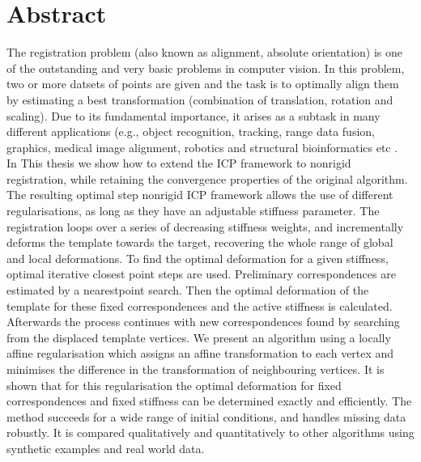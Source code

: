 \documentclass[../structure.tex]{subfiles}
\begin{document}
\chapter*{Abstract}
\hspace{.5cm} The registration problem (also known as alignment, absolute orientation) is one of the outstanding and very basic problems in computer vision. In this problem, two or more datsets of points are given and the task is to optimally align them by estimating a best transformation (combination of translation, rotation and scaling). Due to its fundamental importance, it arises as a subtask in many different applications (e.g., object recognition, tracking, range data fusion, graphics, medical image alignment, robotics and structural bioinformatics etc \cite{Li2007}.
\\In This thesis we show how to extend the ICP framework to nonrigid registration, while retaining the convergence properties of the original algorithm. The resulting optimal step nonrigid ICP framework allows the use of different regularisations, as long as they have an adjustable stiffness parameter. The registration loops over a series of decreasing stiffness weights, and incrementally deforms the template towards the target, recovering the whole range of global and local deformations. To find the optimal deformation for a given stiffness, optimal iterative closest point steps are used. Preliminary correspondences are estimated by a nearestpoint search. Then the optimal deformation of the template for these fixed correspondences and the active stiffness is calculated. Afterwards the process continues with new correspondences found by searching from the displaced template vertices. We present an algorithm using a locally affine regularisation which assigns an affine transformation to each vertex and minimises the difference in the transformation of neighbouring vertices. It is shown that for this regularisation the optimal deformation for fixed correspondences and fixed stiffness can be determined exactly and efficiently. The method succeeds for a wide range of initial conditions, and handles missing data robustly. It is compared qualitatively and quantitatively to other algorithms using synthetic examples and real world data\cite{Amberg2007}.
\end{document}
